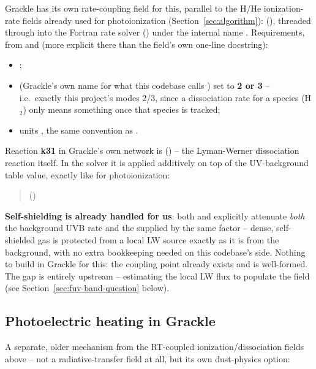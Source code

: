Grackle has its own rate-coupling field for this, parallel to the
H/He ionization-rate fields already used for photoionization
(Section~\ref{sec:algorithm}):
 (), threaded
through  into the Fortran rate solver
() under the internal name
. Requirements, from 
and  (more explicit there than the field's own
one-line docstring):
\begin{itemize}
  \item {};
  \item {} (Grackle's own name for what this
    codebase calls ) set to \textbf{2 or
    3} -- i.e.\ exactly this project's modes 2/3, since a
    dissociation rate for a species (H$_2$) only means something once
    that species is tracked;
  \item units , the same convention as
    .
\end{itemize}
Reaction \textbf{k31} in Grackle's own network is
 () -- the
Lyman-Werner dissociation reaction itself. In the solver it is applied
additively on top of the UV-background table value, exactly like
 for photoionization:
\begin{quote}
 \quad
()
\end{quote}
\textbf{Self-shielding is already handled for us}: both
 and  explicitly
attenuate \emph{both} the background UVB rate and the supplied
 by the same factor -- dense,
self-shielded gas is protected from a local LW source exactly as it is
from the background, with no extra bookkeeping needed on this
codebase's side. Nothing to build in Grackle for this: the coupling
point already exists and is well-formed. The gap is entirely upstream
-- estimating the local LW flux to populate the field (see
Section~\ref{sec:fuv-band-question} below).

\subsection{Photoelectric heating in Grackle}
\label{sec:fuv-pe-grackle}

A separate, older mechanism from the RT-coupled ionization/dissociation
fields above -- not a radiative-transfer field at all, but its own
dust-physics option:


